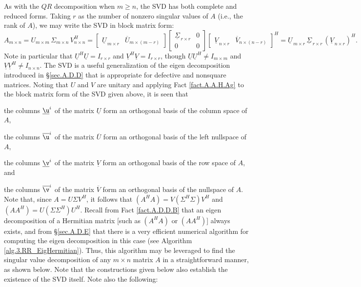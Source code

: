 As with the $QR$ decomposition when $m\ge n$, the SVD has both
complete and reduced forms.  Taking $r$ as the number of nonzero singular
values of $A$ (i.e., the rank of $A$), we may write the SVD in block
matrix form:
\begin{equation}
  A_{m\times n}=U_{m\times m} \,\Sigma_{m\times n} \,V^{H}_{n\times n} = 
  \begin{bmatrix} {\underline U}_{\,m \times r} & {\overline U}_{m \times (m-r)} \end{bmatrix}
  \begin{bmatrix} {\underline{\Sigma}}_{\,r \times r} & 0 \\ 
		  0 & 0 \end{bmatrix}
  \begin{bmatrix} {\underline V}_{\,n \times r} & {\overline V}_{n \times (n-r)} \end{bmatrix}^{H}
      ={\underline U}_{\,m\times r} \,{\underline{\Sigma}}_{\,r\times r} \,({\underline V}_{\,n\times r})^{H}. \label{SVDforms}
\end{equation}
Note in particular that $\underline U^H \underline U=I_{r\times r}$ and $\underline V^H \underline V=I_{r\times r}$,
though $\underline U \underline U^H \ne I_{m\times m}$ and $\underline V \underline V^H \ne I_{n\times n}$.
The SVD is a useful generalization of the eigen decomposition
introduced in \S \ref{sec.A.D.D} that is appropriate for defective and
nonsquare matrices.  Noting that $U$ and $V$ are unitary and applying
Fact \ref{fact.A.A.H.Ag} to the block matrix form of the SVD given
above, it is seen that
\beginmylistb
\item the columns $\underline\u^i$ of the matrix $\underline U$ form an orthogonal basis of the column space of $A$,
\item the columns $\overline\u^i$ of the matrix $\overline U$ form an orthogonal basis of the left nullspace of $A$,
\item the columns $\underline\v^i$ of the matrix $\underline V$ form an orthogonal basis of the row space of $A$, and
\item the columns $\overline\v^i$ of the matrix $\overline V$ form an orthogonal basis of the nullspace of $A$.
\endmylist
Note that, since $A=U \Sigma V^{H}$, it follows that $(A^{H}
A)=V (\Sigma^{H}\Sigma) V^{H}$ and $(A A^{H})=U (\Sigma\Sigma^{H})
U^{H}$.  Recall from Fact \ref{fact.A.D.D.B} that an eigen decomposition
of a Hermitian matrix [such as $(A^{H} A)$ or $(A
A^{H})$] always exists, and from \S \ref{sec.A.D.E} that there is a very efficient numerical algorithm for
computing the eigen decomposition in this case (see Algorithm \ref{alg.3.RR_EigHermitian}).  Thus, this algorithm may be leveraged
to find the singular value decomposition of any $m\times n$ matrix $A$
in a straightforward manner, as shown below.  Note that the
constructions given below also establish the existence of the SVD
itself.  Note also the following:

